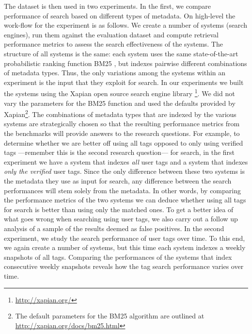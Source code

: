 The dataset is then used in two experiments. In the first, we compare performance of search based on different types of metadata. On high-level the work-flow for the experiment is as follows. We create a number of systems (search engines), run them against the evaluation dataset and compute retrieval performance metrics to assess the search effectiveness of the systems. The structure of all systems is the same: each system uses the same state-of-the-art probabilistic ranking function BM25 \cite{bm25}, but indexes pairwise different combinations of metadata types. Thus, the only variations among the systems within an experiment is the input that they exploit for search. In our experiments we built the systems using the Xapian open source search engine library \footnote{\url{http://xapian.org/}}. We did not vary the parameters for the BM25 function and used the defaults provided by Xapian\footnote{The default parameters for the BM25 algorithm are outlined at \url{http://xapian.org/docs/bm25.html}}. The combinations of metadata types that are indexed by the various systems are strategically chosen so that the resulting performance metrics from the benchmarks will provide answers to the research questions. For example, to determine whether we are better off using all tags opposed to only using verified tags ---remember this is the second research question--- for search, in the first experiment we have a system that indexes \textit{all} user tags and a system that indexes \textit{only the verified} user tags. Since the only difference between these two systems is the metadata they use as input for search, any difference between the search performances will stem solely from the metadata. In other words, by comparing the performance metrics of the two systems we can deduce whether using all tags for search is better than using only the matched ones. To get a better idea of what goes wrong when searching using user tags, we also carry out a follow up analysis of a sample of the results deemed as false positives.
In the second experiment, we study the search performance of user tags over time. To this end, we again create a number of systems, but this time each system indexes a weekly snapshots of all tags. Comparing the performances of the systems that index consecutive weekly snapshots reveals how the tag search performance varies over time.

